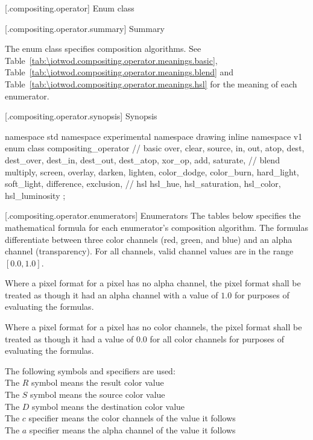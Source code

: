 [\iotwod.compositing.operator] {Enum class }

 [\iotwod.compositing.operator.summary] { 
Summary}

\pnum
The  enum class specifies composition algorithms. See Table~\ref{tab:\iotwod.compositing.operator.meanings.basic}, 
Table~\ref{tab:\iotwod.compositing.operator.meanings.blend} and 
Table~\ref{tab:\iotwod.compositing.operator.meanings.hsl} for the meaning of 
each  enumerator.

 [\iotwod.compositing.operator.synopsis] { 
Synopsis}

\begin{codeblock}
namespace std { namespace experimental { namespace drawing { inline namespace 
v1 {
  enum class compositing_operator {
    // basic
    over,
    clear,
    source,
    in,
    out,
    atop,
    dest,
    dest_over,
    dest_in,
    dest_out,
    dest_atop,
    xor_op,
    add,
    saturate,
    // blend
    multiply,
    screen,
    overlay,
    darken,
    lighten,
    color_dodge,
    color_burn,
    hard_light,
    soft_light,
    difference,
    exclusion,
    // hsl
    hsl_hue,
    hsl_saturation,
    hsl_color,
    hsl_luminosity
  };
} } } }
\end{codeblock}

 [\iotwod.compositing.operator.enumerators] { 
Enumerators}
\pnum
The tables below specifies the mathematical formula for each enumerator's composition algorithm. The formulas differentiate between three color channels (red, green, and blue) and an alpha channel (transparency). For all channels, valid channel values are in the range $[0.0, 1.0]$.

\pnum
Where a pixel format for a pixel has no alpha channel, the pixel format shall be treated as though it had an alpha channel with a value of $1.0$ for purposes of evaluating the formulas.

\pnum
Where a pixel format for a pixel has no color channels, the pixel format shall be treated as though it had a value of $0.0$ for all color channels for purposes of evaluating the formulas.

\pnum
The following symbols and specifiers are used:\\
\hspace*{1em}The $R$ symbol means the result color value\\
\hspace*{1em}The $S$ symbol means the source color value\\
\hspace*{1em}The $D$ symbol means the destination color value\\
\hspace*{1em}The $c$ specifier means the color channels of the value it 
follows\\
\hspace*{1em}The $a$ specifier means the alpha channel of the value it follows\\

